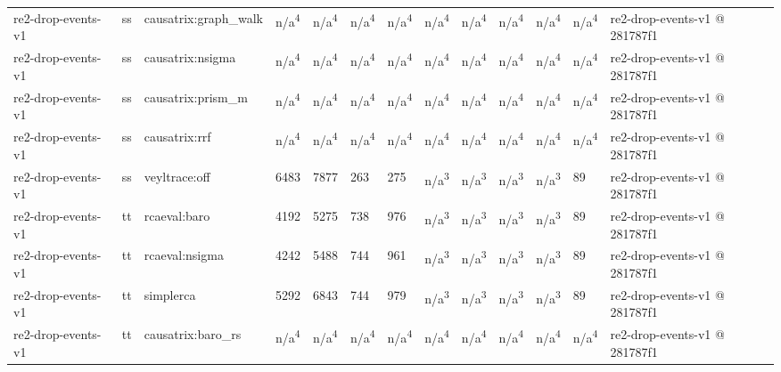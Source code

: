 \begin{table}[t]
\begin{tabular}{lllllllllllll}
re2-drop-events-v1 & ss & causatrix:graph\_walk & n/a\textsuperscript{4} & n/a\textsuperscript{4} & n/a\textsuperscript{4} & n/a\textsuperscript{4} & n/a\textsuperscript{4} & n/a\textsuperscript{4} & n/a\textsuperscript{4} & n/a\textsuperscript{4} & n/a\textsuperscript{4} & re2-drop-events-v1 @ 281787f1 \\
re2-drop-events-v1 & ss & causatrix:nsigma & n/a\textsuperscript{4} & n/a\textsuperscript{4} & n/a\textsuperscript{4} & n/a\textsuperscript{4} & n/a\textsuperscript{4} & n/a\textsuperscript{4} & n/a\textsuperscript{4} & n/a\textsuperscript{4} & n/a\textsuperscript{4} & re2-drop-events-v1 @ 281787f1 \\
re2-drop-events-v1 & ss & causatrix:prism\_m & n/a\textsuperscript{4} & n/a\textsuperscript{4} & n/a\textsuperscript{4} & n/a\textsuperscript{4} & n/a\textsuperscript{4} & n/a\textsuperscript{4} & n/a\textsuperscript{4} & n/a\textsuperscript{4} & n/a\textsuperscript{4} & re2-drop-events-v1 @ 281787f1 \\
re2-drop-events-v1 & ss & causatrix:rrf & n/a\textsuperscript{4} & n/a\textsuperscript{4} & n/a\textsuperscript{4} & n/a\textsuperscript{4} & n/a\textsuperscript{4} & n/a\textsuperscript{4} & n/a\textsuperscript{4} & n/a\textsuperscript{4} & n/a\textsuperscript{4} & re2-drop-events-v1 @ 281787f1 \\
re2-drop-events-v1 & ss & veyltrace:off & 6483 & 7877 & 263 & 275 & n/a\textsuperscript{3} & n/a\textsuperscript{3} & n/a\textsuperscript{3} & n/a\textsuperscript{3} & 89 & re2-drop-events-v1 @ 281787f1 \\
re2-drop-events-v1 & tt & rcaeval:baro & 4192 & 5275 & 738 & 976 & n/a\textsuperscript{3} & n/a\textsuperscript{3} & n/a\textsuperscript{3} & n/a\textsuperscript{3} & 89 & re2-drop-events-v1 @ 281787f1 \\
re2-drop-events-v1 & tt & rcaeval:nsigma & 4242 & 5488 & 744 & 961 & n/a\textsuperscript{3} & n/a\textsuperscript{3} & n/a\textsuperscript{3} & n/a\textsuperscript{3} & 89 & re2-drop-events-v1 @ 281787f1 \\
re2-drop-events-v1 & tt & simplerca & 5292 & 6843 & 744 & 979 & n/a\textsuperscript{3} & n/a\textsuperscript{3} & n/a\textsuperscript{3} & n/a\textsuperscript{3} & 89 & re2-drop-events-v1 @ 281787f1 \\
re2-drop-events-v1 & tt & causatrix:baro\_rs & n/a\textsuperscript{4} & n/a\textsuperscript{4} & n/a\textsuperscript{4} & n/a\textsuperscript{4} & n/a\textsuperscript{4} & n/a\textsuperscript{4} & n/a\textsuperscript{4} & n/a\textsuperscript{4} & n/a\textsuperscript{4} & re2-drop-events-v1 @ 281787f1 \\

\end{tabular}
\end{table}
